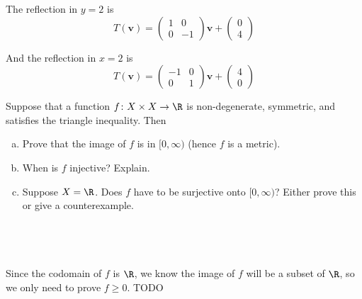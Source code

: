 \documentclass[a4paper]{article}
\begin{document}
The reflection in $y=2$ is \[ T(\mathbf v) = \begin{pmatrix} 1 & 0 \\ 0 & -1 \end{pmatrix} \mathbf v + \begin{pmatrix} 0 \\ 4 \end{pmatrix} \]

And the reflection in $x=2$ is \[ T(\mathbf v) = \begin{pmatrix} -1 & 0 \\ 0 & 1 \end{pmatrix} \mathbf v + \begin{pmatrix} 4 \\ 0 \end{pmatrix} \]



\begin{questionbody}
Suppose that a function $f \colon X \times X \to \R$ is non-degenerate, symmetric, and satisfies the triangle inequality. Then \begin{enumerate}[(a)]
\item Prove that the image of $f$ is in $[0, \infty)$ (hence $f$ is a metric). %
\item When is $f$ injective? Explain.
\item Suppose $X = \R$. Does $f$ have to be surjective onto $[0, \infty)$? Either prove this or give a counterexample. %
\end{enumerate}
\end{questionbody}

\subsection{~} %

Since the codomain of $f$ is $\R$, we know the image of $f$ will be a subset of $\R$, so we only need to prove $f \ge 0$. TODO

\subsection{~} %

\subsection{~} %

\end{document}
